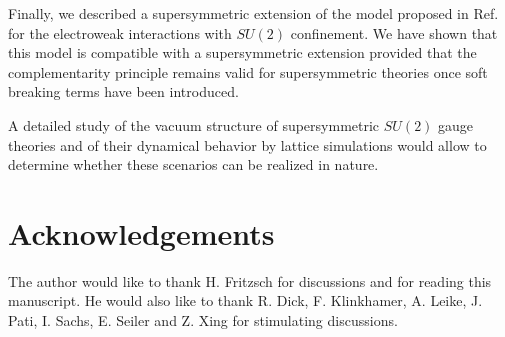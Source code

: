 \documentclass[a4paper,12pt]{article}
\begin{document}
Finally, we described a supersymmetric extension of the model proposed
in Ref. \cite{CF} for the electroweak interactions with $SU(2)$
confinement. We have shown that this model is compatible with a
supersymmetric extension provided that the complementarity principle
remains valid for supersymmetric theories once soft breaking terms
have been introduced.

A detailed study of the vacuum structure of supersymmetric $SU(2)$
gauge theories and of their dynamical behavior by lattice simulations
would allow to determine whether these scenarios can be realized in
nature.

\section*{Acknowledgements}
The author would like to thank H. Fritzsch for discussions and for
reading this manuscript. He would also like to thank R. Dick, F.
Klinkhamer, A. Leike, J.  Pati, I. Sachs, E. Seiler and Z. Xing for
stimulating discussions.
\end{document}
